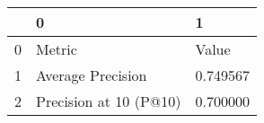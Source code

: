 \begin{tabular}{lll}
\toprule
 & 0 & 1 \\
\midrule
0 & Metric & Value \\
1 & Average Precision & 0.749567 \\
2 & Precision at 10 (P@10) & 0.700000 \\
\bottomrule
\end{tabular}

